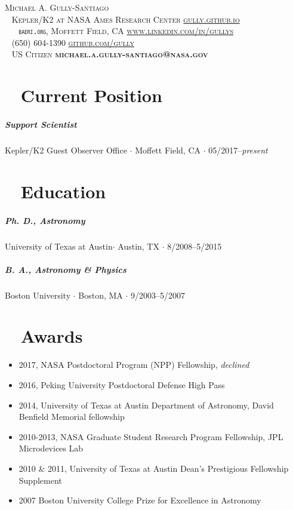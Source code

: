 \documentclass[10pt,letterpaper]{article}
\newcommand{\namestyle}{\Huge \scshape}
\newcommand{\addressstyle}{\color{addresscolor}  \footnotesize \sffamily \upshape}
\begin{document}
\begin{flushleft}
    \namestyle Michael A. Gully-Santiago \\[0.3em]
    \addressstyle
    \faMapMarker ~ Kepler/K2 at NASA Ames Research Center  \hfill \url{gully.github.io} ~ \faExternalLink \\
    ~ ~ \texttt{baeri.org}, Moffett Field, CA  \hfill  \url{www.linkedin.com/in/gullys} ~ \faLinkedin \\
    \faPhone ~ (650) 604-1390 \hfill \url{github.com/gully} ~ \faGithub \\
    \faGlobe ~ US Citizen \hfill \textbf{michael.a.gully-santiago@nasa.gov} ~ \faInbox\\

\end{flushleft}

\small

\section*{\faToggleOn ~ Current Position}

\subparagraph{Support Scientist}
Kepler/K2 Guest Observer Office $\cdot$ Moffett Field, CA $\cdot$ 05/2017--\emph{present}


\section*{\faGraduationCap ~ Education}

\subparagraph{Ph. D., Astronomy}
University of Texas at Austin$\cdot$ Austin, TX $\cdot$ 8/2008--5/2015

\subparagraph{B. A., Astronomy \& Physics}
Boston University $\cdot$ Boston, MA $\cdot$ 9/2003--5/2007


\section*{\faTrophy ~ Awards}

\begin{itemize}
    \item 2017, NASA Postdoctoral Program (NPP) Fellowship,  \emph{declined}
    \item 2016, Peking University Postdoctoral Defense High Pass
    \item 2014, University of Texas at Austin Department of Astronomy, David Benfield Memorial fellowship
    \item 2010-2013, NASA Graduate Student Research Program Fellowship, JPL Microdevices Lab
    \item 2010 \& 2011, University of Texas at Austin Dean's Prestigious Fellowship Supplement
    \item 2007 Boston University College Prize for Excellence in Astronomy
\end{itemize}
\end{document}

